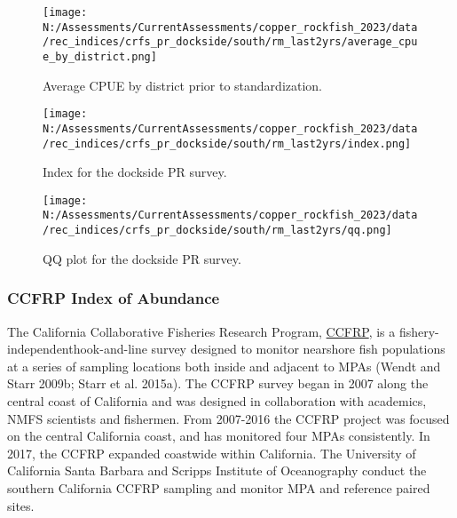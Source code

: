 \documentclass[11pt,
  english,
  letterpaper,
]{article}
\begin{document}
\begin{figure}
\centering
\texttt{[image: N:/Assessments/CurrentAssessments/copper\_rockfish\_2023/data/rec\_indices/crfs\_pr\_dockside/south/rm\_last2yrs/average\_cpue\_by\_district.png]}
\caption{Average CPUE by district prior to standardization.\label{fig:pr-districtcpue}}
\end{figure}

\newpage

\begin{figure}
\centering
\texttt{[image: N:/Assessments/CurrentAssessments/copper\_rockfish\_2023/data/rec\_indices/crfs\_pr\_dockside/south/rm\_last2yrs/index.png]}
\caption{Index for the dockside PR survey.\label{fig:pr-index}}
\end{figure}

\newpage

\begin{figure}
\centering
\texttt{[image: N:/Assessments/CurrentAssessments/copper\_rockfish\_2023/data/rec\_indices/crfs\_pr\_dockside/south/rm\_last2yrs/qq.png]}
\caption{QQ plot for the dockside PR survey.\label{fig:pr-qq}}
\end{figure}

\newpage

\hypertarget{ccfrp-index}{%
\subsubsection{CCFRP Index of Abundance}\label{ccfrp-index}}

The California Collaborative Fisheries Research Program, \href{https://www.mlml.calstate.edu/ccfrp/}{CCFRP}, is a fishery-independenthook-and-line survey designed to monitor nearshore fish populations at a series of sampling locations both inside and adjacent to MPAs (Wendt and Starr 2009b; Starr et al. 2015a). The CCFRP survey began in 2007 along the central coast of California and was designed in collaboration with academics, NMFS scientists and fishermen. From 2007-2016 the CCFRP project was focused on the central California coast, and has monitored four MPAs consistently. In 2017, the CCFRP expanded coastwide within California. The University of California Santa Barbara and Scripps Institute of Oceanography conduct the southern California CCFRP sampling and monitor MPA and reference paired sites.
\end{document}
